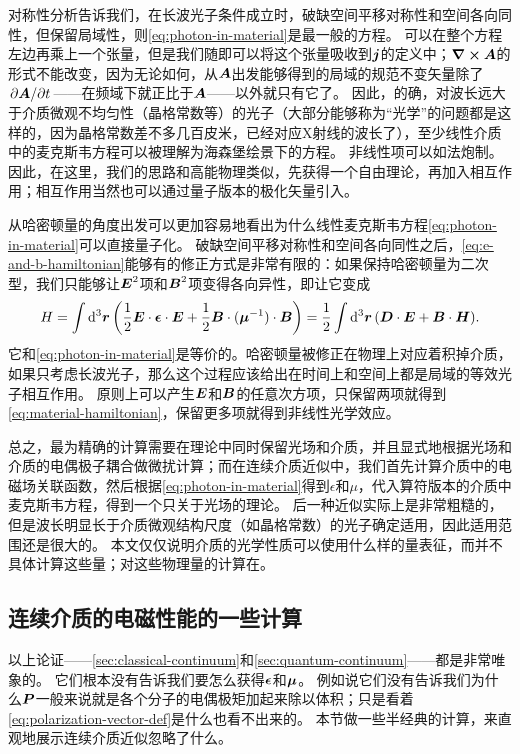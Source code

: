 对称性分析告诉我们，在长波光子条件成立时，破缺空间平移对称性和空间各向同性，但保留局域性，则\eqref{eq:photon-in-material}是最一般的方程。
可以在整个方程左边再乘上一个张量，但是我们随即可以将这个张量吸收到$\vb*{j}$的定义中；$\curl{\vb*{A}}$的形式不能改变，因为无论如何，从$\vb*{A}$出发能够得到的局域的规范不变矢量除了$\pdv*{\vb*{A}}{t}$——在频域下就正比于$\vb*{A}$——以外就只有它了。
因此，的确，对波长远大于介质微观不均匀性（晶格常数等）的光子（大部分能够称为“光学”的问题都是这样的，因为晶格常数差不多几百皮米，已经对应X射线的波长了），至少线性介质中的麦克斯韦方程可以被理解为海森堡绘景下的方程。
非线性项可以如法炮制。因此，在这里，我们的思路和高能物理类似，先获得一个自由理论，再加入相互作用；相互作用当然也可以通过量子版本的极化矢量引入。

从哈密顿量的角度出发可以更加容易地看出为什么线性麦克斯韦方程\eqref{eq:photon-in-material}可以直接量子化。
破缺空间平移对称性和空间各向同性之后，\eqref{eq:e-and-b-hamiltonian}能够有的修正方式是非常有限的：如果保持哈密顿量为二次型，我们只能够让$\vb*{E}^2$项和$\vb*{B}^2$项变得各向异性，即让它变成
\begin{equation}
    H = \int \dd[3]{\vb*{r}} \left( \frac{1}{2} \vb*{E} \cdot \vb*{\epsilon} \cdot \vb*{E} + \frac{1}{2} \vb*{B} \cdot (\vb*{\mu}^{-1}) \cdot \vb*{B} \right) = \frac{1}{2} \int \dd[3]{\vb*{r}} (\vb*{D} \cdot \vb*{E} + \vb*{B} \cdot \vb*{H}).
    \label{eq:material-hamiltonian}
\end{equation}
它和\eqref{eq:photon-in-material}是等价的。哈密顿量被修正在物理上对应着积掉介质，如果只考虑长波光子，那么这个过程应该给出在时间上和空间上都是局域的等效光子相互作用。
原则上可以产生$\vb*{E}$和$\vb*{B}$的任意次方项，只保留两项就得到\eqref{eq:material-hamiltonian}，保留更多项就得到非线性光学效应。

总之，最为精确的计算需要在理论中同时保留光场和介质，并且显式地根据光场和介质的电偶极子耦合做微扰计算；而在连续介质近似中，我们首先计算介质中的电磁场关联函数，然后根据\eqref{eq:photon-in-material}得到$\epsilon$和$\mu$，代入算符版本的介质中麦克斯韦方程，得到一个只关于光场的理论。
后一种近似实际上是非常粗糙的，但是波长明显长于介质微观结构尺度（如晶格常数）的光子确定适用，因此适用范围还是很大的。
本文仅仅说明介质的光学性质可以使用什么样的量表征，而并不具体计算这些量；对这些物理量的计算在。

\subsection{连续介质的电磁性能的一些计算}

以上论证——\autoref{sec:classical-continuum}和\autoref{sec:quantum-continuum}——都是非常唯象的。
它们根本没有告诉我们要怎么获得$\vb*{\epsilon}$和$\vb*{\mu}$。
例如说它们没有告诉我们为什么$\vb*{P}$一般来说就是各个分子的电偶极矩加起来除以体积；只是看着\eqref{eq:polarization-vector-def}是什么也看不出来的。
本节做一些半经典的计算，来直观地展示连续介质近似忽略了什么。

